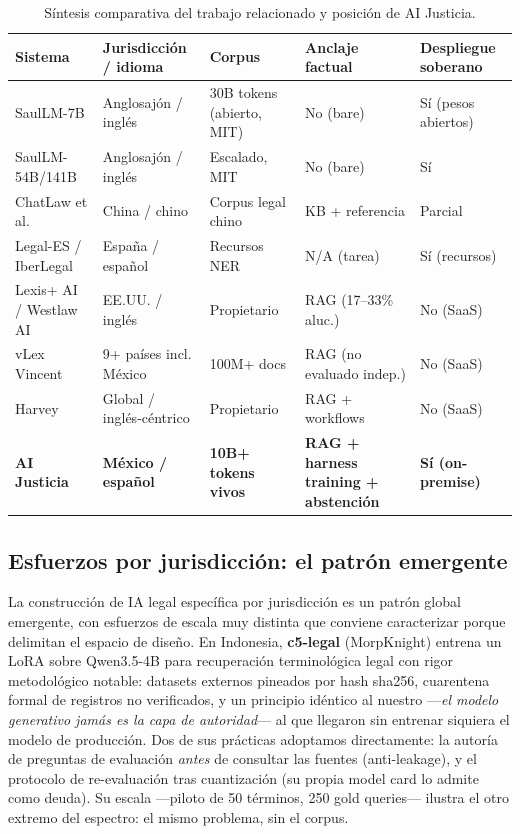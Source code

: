 \begin{table}[H]
\centering\small
\caption{Síntesis comparativa del trabajo relacionado y posición de AI Justicia.}
\label{tab:relacionado}
\begin{tabular}{@{}p{3.1cm}p{2.6cm}p{3.0cm}p{2.6cm}p{2.6cm}@{}}
\toprule
\textbf{Sistema} & \textbf{Jurisdicción / idioma} & \textbf{Corpus} & \textbf{Anclaje factual} & \textbf{Despliegue soberano} \\
\midrule
SaulLM-7B\cite{colombo2024} & Anglosajón / inglés & 30B tokens (abierto, MIT) & No (bare) & Sí (pesos abiertos) \\
SaulLM-54B/141B\cite{saullm54b} & Anglosajón / inglés & Escalado, MIT & No (bare) & Sí \\
ChatLaw et al.\cite{cui2024chatlaw,surveylegal2025} & China / chino & Corpus legal chino & KB + referencia & Parcial \\
Legal-ES / IberLegal\cite{legales2020} & España / español & Recursos NER & N/A (tarea) & Sí (recursos) \\
Lexis+ AI / Westlaw AI\cite{magesh2025} & EE.UU. / inglés & Propietario & RAG (17--33\% aluc.) & No (SaaS) \\
vLex Vincent\cite{vlex2024} & 9+ países incl. México & 100M+ docs & RAG (no evaluado indep.) & No (SaaS) \\
Harvey\cite{harvey2026} & Global / inglés-céntrico & Propietario & RAG + workflows & No (SaaS) \\
\midrule
\textbf{AI Justicia} & \textbf{México / español} & \textbf{10B+ tokens vivos} & \textbf{RAG + harness training + abstención} & \textbf{Sí (on-premise)} \\
\bottomrule
\end{tabular}
\end{table}

\subsection{Esfuerzos por jurisdicción: el patrón emergente}

La construcción de IA legal específica por jurisdicción es un patrón global emergente, con esfuerzos de escala muy distinta que conviene caracterizar porque delimitan el espacio de diseño. En Indonesia, \textbf{c5-legal} (MorpKnight) entrena un LoRA sobre Qwen3.5-4B para recuperación terminológica legal con rigor metodológico notable: datasets externos pineados por hash sha256, cuarentena formal de registros no verificados, y un principio idéntico al nuestro ---\emph{el modelo generativo jamás es la capa de autoridad}--- al que llegaron sin entrenar siquiera el modelo de producción. Dos de sus prácticas adoptamos directamente: la autoría de preguntas de evaluación \emph{antes} de consultar las fuentes (anti-leakage), y el protocolo de re-evaluación tras cuantización (su propia model card lo admite como deuda). Su escala ---piloto de 50 términos, 250 gold queries--- ilustra el otro extremo del espectro: el mismo problema, sin el corpus.

